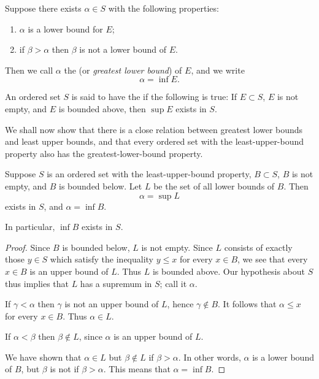 \begin{definition}
Suppose there exists $\alpha\in S$ with the following properties:
\begin{enumerate}[label=(\roman*)]
\item $\alpha$ is a lower bound for $E$;
\item if $\beta>\alpha$ then $\beta$ is not a lower bound of $E$.
\end{enumerate}
Then we call $\alpha$ the  (or \emph{greatest lower bound}) of $E$, and we write
\[ \alpha=\inf E. \]
\end{definition}

\begin{definition}
An ordered set $S$ is said to have the  if the following is true: If $E\subset S$, $E$ is not empty, and $E$ is bounded above, then $\sup E$ exists in $S$. 
\end{definition}

We shall now show that there is a close relation between greatest lower bounds and least upper bounds, and that every ordered set with the least-upper-bound property also has the greatest-lower-bound property.

\begin{theorem}
Suppose $S$ is an ordered set with the least-upper-bound property, $B\subset S$, $B$ is not empty, and $B$ is bounded below. Let $L$ be the set of all lower bounds of $B$. Then
\[ \alpha=\sup L \]
exists in $S$, and $\alpha=\inf B$.

In particular, $\inf B$ exists in $S$.
\end{theorem}

\begin{proof}
Since $B$ is bounded below, $L$ is not empty. Since $L$ consists of exactly those $y\in S$ which satisfy the inequality $y\le x$ for every $x\in B$, we see that every $x\in B$ is an upper bound of $L$. Thus $L$ is bounded above. Our hypothesis about $S$ thus implies that $L$ has a supremum in $S$; call it $\alpha$.

If $\gamma<\alpha$ then $\gamma$ is not an upper bound of $L$, hence $\gamma\notin B$. It follows that $\alpha\le x$ for every $x\in B$. Thus $\alpha\in L$.

If $\alpha<\beta$ then $\beta\notin L$, since $\alpha$ is an upper bound of $L$.

We have shown that $\alpha\in L$ but $\beta\notin L$ if $\beta>\alpha$. In other words, $\alpha$ is a lower bound of $B$, but $\beta$ is not if $\beta>\alpha$. This means that $\alpha=\inf B$.
\end{proof}


